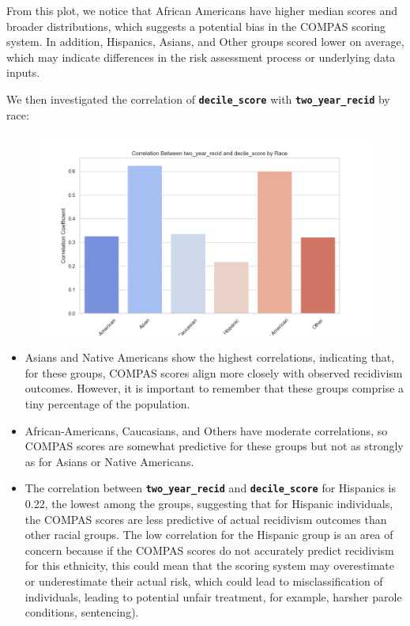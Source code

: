 \documentclass[conference]{IEEEtran}
\begin{document}
	
	From this plot, we notice that African Americans have higher median scores and broader distributions, which suggests a potential bias in the COMPAS scoring system. In addition, Hispanics, Asians, and Other groups scored lower on average, which may indicate differences in the risk assessment process or underlying data inputs.
	
	
	We then investigated the correlation of \textbf{\texttt{decile\_score}} with \textbf{\texttt{two\_year\_recid}} by race:
	
	\begin{figure}
		\centering
		\includegraphics[width=0.9\linewidth]{img/correlation_by_race}
		\caption{}
		\label{fig:correlationbyrace}
	\end{figure}
	
	\begin{itemize}
		\item Asians and Native Americans show the highest correlations, indicating that, for these groups, COMPAS scores align more closely with observed recidivism outcomes. However, it is important to remember that these groups comprise a tiny percentage of the population.
		
		\item African-Americans, Caucasians, and Others have moderate correlations, so COMPAS scores are somewhat predictive for these groups but not as strongly as for Asians or Native Americans.
		
		\item The correlation between \textbf{\texttt{two\_year\_recid}} and \textbf{\texttt{decile\_score}} for Hispanics is 0.22, the lowest among the groups, suggesting that for Hispanic individuals, the COMPAS scores are less predictive of actual recidivism outcomes than other racial groups. The low correlation for the Hispanic group is an area of concern because if the COMPAS scores do not accurately predict recidivism for this ethnicity, this could mean that the scoring system may overestimate or underestimate their actual risk, which could lead to misclassification of individuals, leading to potential unfair treatment, for example, harsher parole conditions, sentencing).
	\end{itemize}
	
\end{document}
